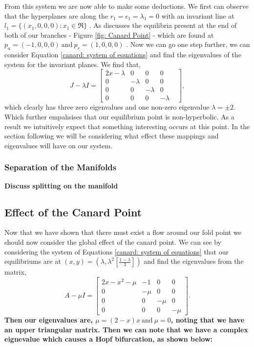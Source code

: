 From this system we are now able to make some deductions. We first can observe that the hyperplanes are along the $r_1=\epsilon_1=\lambda_1=0$ with an invariant line at $l_1=\{(x_1,0,0,0): x_1\in\Re\}$ \citep{krupa2001}. As \citet{krupa2001} discusses the equilibria present at the end of both of our branches - Figure \ref{fig: Canard Point} - which are found at $p_a=(-1,0,0,0) \ \text{and} \ p_r=(1,0,0,0)$ \citep{krupa2001}. Now we can go one step further, we can consider Equation \ref{canard: system of equations} and find the eigenvalues of the system for the invariant planes. We find that, 
\begin{equation}
J-\lambda I= \begin{bmatrix}
2x-\lambda & 0 & 0 & 0  \\
0 & -\lambda & 0 & 0&\\
0 & 0 & -\lambda & 0 \\
0 & 0 & 0 & -\lambda
\end{bmatrix},
\end{equation}
which clearly has three zero eigenvalues and one non-zero eigenvalue $\lambda=\pm 2$. Which further empahsises that our equilibrium point is non-hyperbolic. As a result we intuitively expect that something interesting occurs at this point. In the section following we will be considering what effect these mappings and eigenvalues will have on our system.

\subsubsection{Separation of the Manifolds}

\textbf{Discuss splitting on the manifold}

\subsection{Effect of the Canard Point}\label{sec:effect of the canard point}
Now that we have shown that there must exist a flow around our fold point we should now consider the global effect of the canard point. We can see by considering the  system of Equations \ref{canard: system of equations} that our equilibriums are at $ (x,y)=(\lambda,\lambda^2[\frac{1-\lambda}{3}]) $ and find the eigenvalues from the matrix, 
\begin{equation}
A-\mu I=\begin{bmatrix}
2x-x^2-\mu&-1&0&0\\
0&-\mu&0&0\\
0&0&-\mu&0\\
0&0&0&-\mu
\end{bmatrix}.
\end{equation}
\textbf{Then our eigenvalues are, $ \mu=(2-x)x \ \text{and} \ \mu=0 $, noting that we have an upper triangular matrix. Then we can note that we have a complex eignevalue which causes a Hopf bifurcation, as shown below:}%

